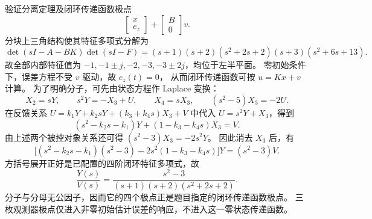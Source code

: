 \documentclass[11pt]{article}
\begin{document}
\begin{solution}
\begin{proofstep}{验证分离定理及闭环传递函数极点}
\[ \begin{bmatrix}x\\e_z\end{bmatrix}
 +\begin{bmatrix}B\\0\end{bmatrix}v.
\]
分块上三角结构使其特征多项式分解为
\[
 \det(sI-A-BK)\det(sI-F)
 =(s+1)(s+2)(s^2+2s+2)(s+3)(s^2+6s+13).
\]
故全部内部特征值为 $-1,-1\pm j,-2,-3,-3\pm2j$，均位于左半平面。
零初始条件下，误差方程不受 $v$ 驱动，故 $e_z(t)=0$，
从而闭环传递函数可按 $u=Kx+v$ 计算。
为了明确分子，可先由状态方程作 Laplace 变换：
\[
 X_2=sY,\qquad s^2Y=-X_3+U,\qquad
 X_4=sX_3,\qquad (s^2-5)X_3=-2U.
\]
在反馈关系 $U=k_1Y+k_2sY+(k_3+k_4s)X_3+V$ 中代入
$U=s^2Y+X_3$，得到
\[
 (s^2-k_2s-k_1)Y+(1-k_3-k_4s)X_3=V.
\]
由上述两个被控对象关系还可得 $(s^2-3)X_3=-2s^2Y$。
因此消去 $X_3$ 后，有
\[
 \bigl[(s^2-k_2s-k_1)(s^2-3)
       -2s^2(1-k_3-k_4s)\bigr]Y=(s^2-3)V.
\]
方括号展开正好是已配置的四阶闭环特征多项式，故
\[
 \boxed{\frac{Y(s)}{V(s)}
 =\frac{s^2-3}{(s+1)(s+2)(s^2+2s+2)}.}
\]
分子与分母无公因子，因而它的四个极点正是题目指定的闭环传递函数极点。
三枚观测器极点仅进入非零初始估计误差的响应，不进入这一零状态传递函数。
\end{proofstep}
\end{solution}
\end{document}
